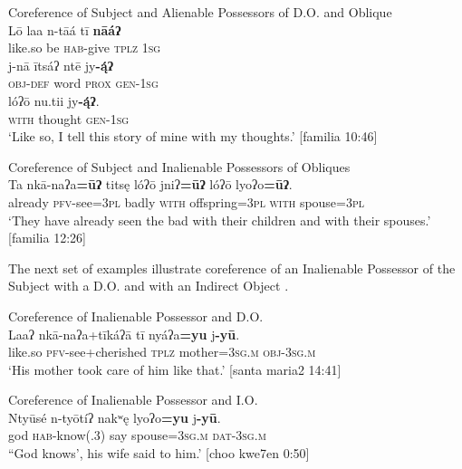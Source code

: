 \documentclass[output=paper]{../langscibook}
\begin{document}
\ea\label{ex:campbell:32}
{Coreference of Subject and Alienable Possessors of D.O. and Oblique}\\
\gll Lō  laa  n-tāá  tī  \textbf{nāáʔ}    \\
     like.so  be  \textsc{hab}{}-give  \textsc{tplz}  \textsc{1sg}    \\
\gll j-nā  ītsáʔ  ntē  jy\textbf{{}-\'{ą}ʔ}\\
     \textsc{obj}{}-\textsc{def}  word  \textsc{prox}  \textsc{gen}{}-\textsc{1sg}\\
\gll lóʔō  nu.tii  jy\textbf{{}-\'{ą}ʔ}.\\
     \textsc{with}  thought  \textsc{gen}{}-\textsc{1sg}\\
\glt ‘Like so, I tell this story of mine with my thoughts.’ [familia 10:46]
\z

\ea\label{ex:campbell:33}
{Coreference of Subject and Inalienable Possessors of Obliques}\\
\gll Ta  nkā-naʔa\textbf{=ūʔ}  titsę  lóʔō  jniʔ\textbf{=ūʔ}  lóʔō  lyoʔo\textbf{=ūʔ}.\\
     already  \textsc{pfv}{}-see=\textsc{3pl}  badly  \textsc{with}  offspring=\textsc{3pl}  \textsc{with}  spouse=\textsc{3pl}  \\
\glt ‘They have already seen the bad with their children and with their spouses.’ [familia 12:26]
\z


The next set of examples illustrate coreference of an Inalienable Possessor of the Subject with a D.O.  and with an Indirect Object .


\ea\label{ex:campbell:34}
{Coreference of Inalienable Possessor and D.O.}\\
\gll Laaʔ  nkā-naʔa+tīkáʔā  tī  nyáʔa\textbf{=yu}  j\textbf{{}-yū}.\\
     like.so  \textsc{pfv}{}-see+cherished  \textsc{tplz}  mother=3\textsc{sg.m}  \textsc{obj-3sg.m}\\
\glt \textsc{‘}His mother took care of him like that.’ [santa maria2 14:41]
\z

\ea\label{ex:campbell:35}
{Coreference of Inalienable Possessor and I.O.}\\
\gll Ntyūsé  n-tyōtíʔ  nakʷę  lyoʔo\textbf{=yu}  j\textbf{{}-yū}.\\
     god  \textsc{hab}{}-know(.3)  say  spouse=\textsc{3sg}.\textsc{m}  \textsc{dat}{}-\textsc{3sg}.\textsc{m}\\
\glt “God knows’, his wife said to him.’ [choo kwe7en 0:50]
\z
\end{document}
